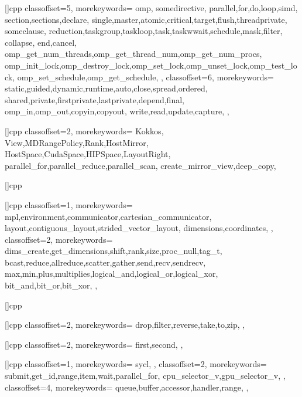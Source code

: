 []{cpp}{
  classoffset=5,
  morekeywords={
    omp,
    somedirective,
    parallel,for,do,loop,simd,
    section,sections,declare,
    single,master,atomic,critical,target,flush,threadprivate,
    someclause,
    reduction,taskgroup,taskloop,task,taskwwait,schedule,mask,filter,
    collapse,
    end,cancel,
    omp_get_num_threads,omp_get_thread_num,omp_get_num_procs,
    omp_init_lock,omp_destroy_lock,omp_set_lock,omp_unset_lock,omp_test_lock,
    omp_set_schedule,omp_get_schedule,
  },
  classoffset=6,
  morekeywords={
    static,guided,dynamic,runtime,auto,close,spread,ordered,
    shared,private,firstprivate,lastprivate,depend,final,
    omp_in,omp_out,copyin,copyout,
    write,read,update,capture,
  },
}


[]{cpp}{
  classoffset=2,
  morekeywords={
    Kokkos,
    View,MDRangePolicy,Rank,HostMirror,
    HostSpace,CudaSpace,HIPSpace,LayoutRight,
    parallel_for,parallel_reduce,parallel_scan,
    create_mirror_view,deep_copy,
  }
}

[]{cpp}{
}

[]{cpp}{
  classoffset=1,
  morekeywords={
    mpl,environment,communicator,cartesian_communicator,
    layout,contiguous_layout,strided_vector_layout,
    dimensions,coordinates,
  },
  classoffset=2,
  morekeywords={
    dims_create,get_dimensions,shift,rank,size,proc_null,tag_t,
    bcast,reduce,allreduce,scatter,gather,send,recv,sendrecv,  
    max,min,plus,multiplies,logical_and,logical_or,logical_xor,
    bit_and,bit_or,bit_xor,
  },
}

[]{cpp}{
}

[]{cpp}{
  classoffset=2,
  morekeywords={
    drop,filter,reverse,take,to,zip,
  },
}

[]{cpp}{
  classoffset=2,
  morekeywords={
    first,second,
  },
}

[]{cpp}{
  classoffset=1,
  morekeywords={
    sycl,
  },
  classoffset=2,
  morekeywords={
    submit,get_id,range,item,wait,parallel_for,
    cpu_selector_v,gpu_selector_v,
  },
  classoffset=4,
  morekeywords={
    queue,buffer,accessor,handler,range,
  },
}

